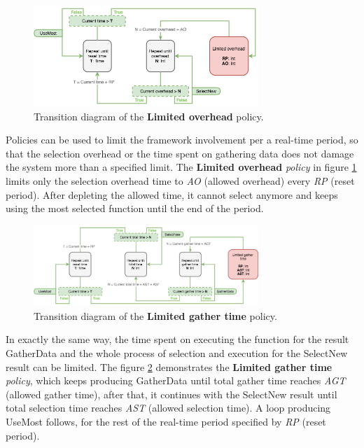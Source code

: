 \begin{figure}[h!]
	\captionsetup{justification=centering,margin=0.5cm}
	\centerline{\mbox{\includegraphics[width=85mm]{./img/limited_overhead.png}}}
	\caption{Transition diagram of the \textbf{Limited overhead} policy.}
	\label{fig:limited_overhead}
\end{figure}

Policies can be used to limit the framework involvement per a real-time period, so that the selection overhead or the time spent on gathering data does not damage the system more than a specified limit. The \textbf{Limited overhead} \textit{policy} in figure \ref{fig:limited_overhead} limits only the selection overhead time to \textit{AO} (allowed overhead) every \textit{RP} (reset period). After depleting the allowed time, it cannot select anymore and keeps using the most selected function until the end of the period.

\begin{figure}[h!]
	\captionsetup{justification=centering,margin=0.5cm}
	\centerline{\mbox{\includegraphics[width=85mm]{./img/limited_gather_time.png}}}
	\caption{Transition diagram of the \textbf{Limited gather time} policy.}
	\label{fig:limited_gather_time}
\end{figure}

In exactly the same way, the time spent on executing the function for the result GatherData and the whole process of selection and execution for the SelectNew result can be limited. The figure \ref{fig:limited_gather_time} demonstrates the \textbf{Limited gather time} \textit{policy}, which keeps producing GatherData until total gather time reaches \textit{AGT} (allowed gather time), after that, it continues with the SelectNew result until total selection time reaches \textit{AST} (allowed selection time). A loop producing UseMost follows, for the rest of the real-time period specified by \textit{RP} (reset period).

